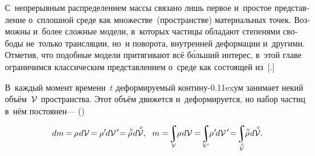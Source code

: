 \begin{otherlanguage}{russian}

С~непрерывным распределением массы связано лишь первое и~простое представление о~сплошной среде как множестве~(пространстве) материальных точек.
Возможны и~более сложные модели, в~которых частицы обладают степенями свободы не~только трансляции, но~и поворота, внутренней деформации и~другими.
Отметив, что подобные модели притягивают всё б\'{о}льший интерес, в~этой главе ограничимся классическим представлением о~среде как состоящей из~[.]

В~каждый момент времени~$t$ деформируемый контину\kern-0.11exум занимает некий объём~${\mathcal{V}\hspace{.1ex}}$ пространства.
Этот объём движется и~деформируется, но набор частиц в~нём постоянен\:---  ()

\nopagebreak\vspace{-0.2em}\begin{equation}\label{balanceofmass}
dm \hspace{-0.15ex}
= \hspace{-0.2ex} \rho \hspace{.2ex} d\mathcal{V} \hspace{-0.2ex}
= \hspace{-0.2ex} \rho\hspace{.1ex}' \hspace{-0.2ex} d\mathcal{V}\hspace{.2ex}' \hspace{-0.5ex}
= \hspace{-0.2ex} \mathcircabove{\rho} \hspace{.22ex} d\mathcircabove{\mathcal{V}} ,
\hspace{.6em}
%
m = \hspace{-0.4ex} \scalebox{0.9}{$\displaystyle\integral\displaylimits_{\mathcal{V}}$} \hspace{-0.2ex} \rho \hspace{.2ex} d\mathcal{V} \hspace{-0.1ex}
= \hspace{-0.4ex} \scalebox{0.9}{$\displaystyle\integral\displaylimits_{\mathcal{V}\hspace{.12ex}'}$} \hspace{-0.2ex} \rho\hspace{.1ex}' \hspace{-0.2ex} d\mathcal{V}\hspace{.2ex}' \hspace{-0.4ex}
= \hspace{-0.4ex} \scalebox{0.9}{$\displaystyle\integral\displaylimits_{\mathcircabove{\mathcal{V}}}$} \hspace{-0.2ex} \mathcircabove{\rho} \hspace{.22ex} d\mathcircabove{\mathcal{V}} .
\vspace{-0.5em}\end{equation}


\end{otherlanguage}
